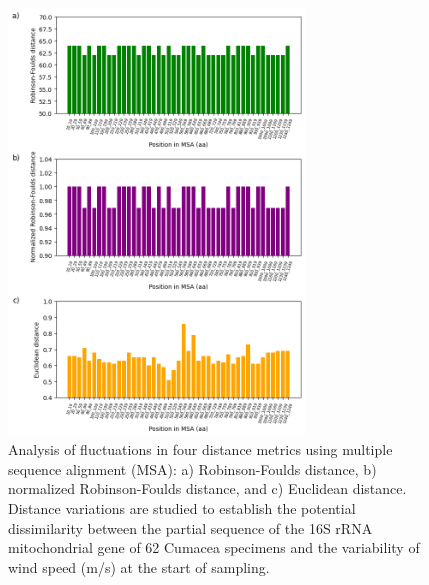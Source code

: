 {\begin{figure}[]
    \centering
    \includegraphics[width=0.7\textwidth]{figure5.png}
     \caption{Analysis of fluctuations in four distance metrics using multiple sequence alignment (MSA): a) Robinson-Foulds distance, b) normalized Robinson-Foulds distance, and c) Euclidean distance. Distance variations are studied to establish the potential dissimilarity between the partial sequence of the 16S rRNA mitochondrial gene of 62 Cumacea specimens and the variability of wind speed (m/s) at the start of sampling. \label{fig:fig6}}
\end{figure}

}
